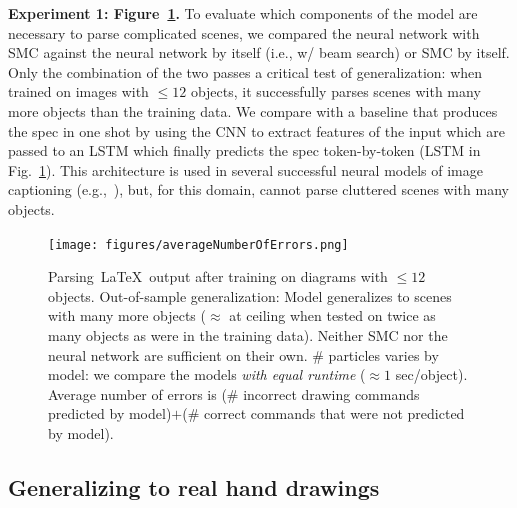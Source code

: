 \documentclass{article}
\theoremstyle{definition}
\begin{document}
\textbf{Experiment 1: Figure~\ref{syntheticResults}.}
  To evaluate which components of the model are necessary to parse complicated scenes,
  we compared  the neural network
  with SMC against the neural network by
itself (i.e., w/ beam search) or SMC by itself.  Only the combination of the two passes a
critical test of generalization: when trained on images with $\leq 12$
objects, it successfully parses scenes with many more objects than the
training data.
We compare with a baseline that produces the spec in one shot by
using the CNN to extract features of the input which are passed to an LSTM which finally predicts
the spec token-by-token (LSTM in Fig.~\ref{syntheticResults}).
This architecture is used in several successful neural models of image captioning (e.g.,~\cite{vinyals2015show}),
but, for this domain, cannot parse cluttered scenes with many objects.
\begin{figure}[h]\centering
  \begin{minipage}[c]{7cm}
      \texttt{[image: figures/averageNumberOfErrors.png]}    
  \end{minipage}\hspace{0.5cm}%
  \begin{minipage}[c]{6cm}
      \caption{Parsing~\LaTeX~output after training on diagrams with $\leq 12$ objects. Out-of-sample generalization: Model generalizes to scenes with many more objects ($\approx$ at ceiling when tested on twice as many objects as were in the training data). Neither SMC nor the neural network are sufficient on their own. \# particles varies by model: we compare the models \emph{with equal runtime} ($\approx 1$ sec/object). Average number of errors is (\# incorrect drawing commands predicted by model)$+$(\# correct commands that were not predicted by model).}\label{syntheticResults}
    \end{minipage}
  \end{figure}

\subsection{Generalizing to real hand drawings}\label{generalizingTheHandDrawings}
\end{document}
